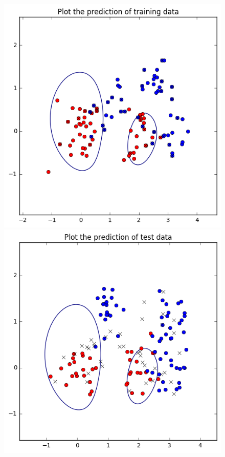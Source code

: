 \documentclass[a4paper,11pt]{article}
\begin{document}
\begin{figure}[htbp]
  \includegraphics[scale=0.5]{trcvsmo.png}
  \includegraphics[scale=0.5]{tecvsmo.png}
\end{figure}
\end{document}
